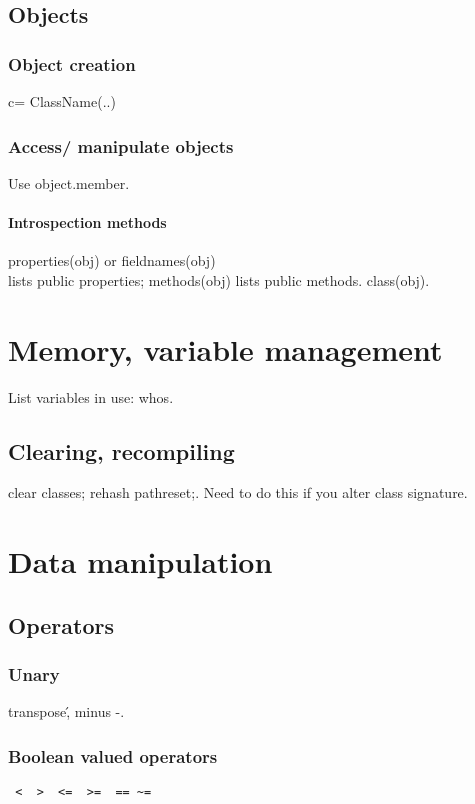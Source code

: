 \documentclass[oneside, article]{memoir}
\begin{document}
\subsection{Objects}
\subsubsection{Object creation}
c= ClassName(..)

\subsubsection{Access/ manipulate objects}
Use object.member.

\paragraph*{Introspection methods}
properties(obj) or fieldnames(obj) \\
lists public properties; methods(obj) lists public methods. class(obj).


\section{Memory, variable management}
List variables in use: whos.

\subsection{Clearing, recompiling}
clear classes; rehash pathreset;. Need to do this if you alter class signature.

\section{Data manipulation}
\subsection{Operators}
\subsubsection{Unary}
transpose\', minus -.

\subsubsection{Boolean valued operators}
\begin{verbatim}
 <  >  <=  >=  == ~=
\end{verbatim}
\end{document}
